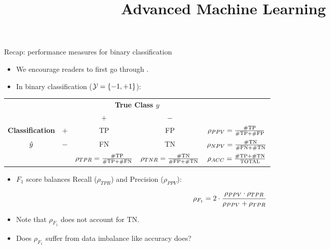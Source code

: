 \documentclass[11pt,compress,t,notes=noshow, xcolor=table]{beamer}
\title{Advanced Machine Learning}
\date{}
\begin{document}



\sloppy

\begin{vbframe}{Recap: performance measures for binary classification}
    \footnotesize{
        \begin{itemize}
            \item We encourage readers to first go through \href{https://slds-lmu.github.io/i2ml/chapters/04_evaluation/04-08-measures-classification/}{}.
            \item In binary classification  ($\mathcal{Y} = \{-1,+1\}$):

		\end{itemize}
		
		\begin{center}
		\tiny
		\renewcommand{\arraystretch}{1.1}
		\begin{tabular}{cc||cc|c}
			& & \multicolumn{2}{c|}{\bfseries True Class $y$} & \\
			& & $+$ & $-$ & \\ 
			\hline \hline
			\bfseries Classification     & $+$ & TP & FP & $\rho_{PPV} = \frac{\# \text{TP}}{\# \text{TP} + \# \text{FP}}$\\
			$\hat{y}$ & $-$ & FN & TN & $\rho_{NPV} = \frac{\# \text{TN}}{\# \text{FN} + \# \text{TN}}$\\
			\hline
			& & $\rho_{TPR} = \frac{\# \text{TP}}{\# \text{TP} + \# \text{FN}}$ & $\rho_{TNR} = \frac{\# \text{TN}}{\# \text{FP} + \# \text{TN}}$ & $\rho_{ACC} = \frac{\# \text{TP}+ \# \text{TN}}{\text{TOTAL}}$
		\end{tabular}
		\renewcommand{\arraystretch}{1}
        \end{center}

        \begin{itemize}
            \item $F_1$ score balances Recall ($\rho_{TPR}$) and Precision ($\rho_{PPV}$):
            $$\rho_{F_1} = 2 \cdot \cfrac{\rho_{PPV} \cdot \rho_{TPR}}{\rho_{PPV} + \rho_{TPR}}$$
            
            \item Note that $\rho_{F_1}$ does not account for TN.
            
            \item Does $\rho_{F_1}$ suffer from data imbalance like accuracy does?
        \end{itemize}
            
    }
    
\end{vbframe}
\end{document}
